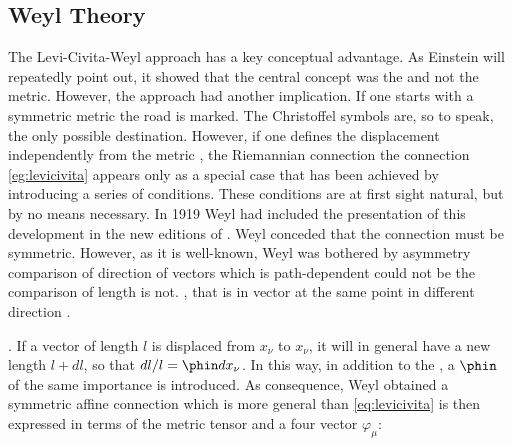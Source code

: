 {\subsection{Weyl Theory}

The Levi-Civita-Weyl approach has a key conceptual advantage. As Einstein will repeatedly point out, it showed that the central concept was the  and not the metric. However, the approach had another implication. If one starts with a symmetric metric \gmn the road is marked. The Christoffel symbols are, so to speak, the only possible destination. However, if one defines the displacement \Gtmn independently from the metric \gmn, the Riemannian connection the connection \cref{eg:levicivita} appears only as a special case that has been achieved by introducing a series of conditions. These conditions are at first sight natural, but by no means necessary. In 1919 Weyl had included the presentation of this development in the new editions of  \citep{Weyl1919}. Weyl conceded that the connection must be symmetric. However, as it is well-known, Weyl was bothered by asymmetry comparison of direction of vectors which is path-dependent could not be the comparison of length is not. , that is in vector at the same point in different direction \citep[102]{Weyl1919a}.


. If a vector of length $l$ is displaced from $x_\nu$ to $x_\nu$, it will in general have a new length $l+dl$, so that $dl/l=\phin dx_\nu$. In this way, in addition to the  \gmn, a  $\phin$ of the same importance is introduced. As consequence, Weyl obtained a  symmetric affine connection which is more general than \cref{eq:levicivita} \citep[112]{Weyl1919} is then expressed in terms of the metric tensor and a four vector $\varphi_{\mu}$:

}
